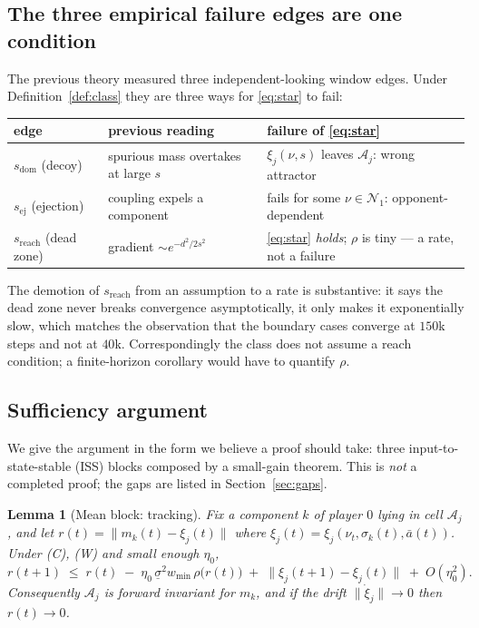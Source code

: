 \documentclass[11pt]{article}
\newtheorem{lemma}{Lemma}
\theoremstyle{definition}
\newcommand{\cA}{\mathcal{A}}
\newcommand{\cN}{\mathcal{N}}
\begin{document}
\subsection{The three empirical failure edges are one condition}

The previous theory measured three independent-looking window edges. Under
Definition~\ref{def:class} they are three ways for \eqref{eq:star} to fail:

\begin{center}
\begin{tabular}{@{}l p{} p{}@{}}
\hline
edge & previous reading & failure of \eqref{eq:star}\\
\hline
$s_{\mathrm{dom}}$ (decoy) & spurious mass overtakes at large $s$ &
  $\xi_j(\nu,s)$ leaves $\cA_j$: wrong attractor\\
$s_{\mathrm{ej}}$ (ejection) & coupling expels a component &
  fails for some $\nu \in \cN_1$: opponent-dependent\\
$s_{\mathrm{reach}}$ (dead zone) & gradient $\sim e^{-d^2/2s^2}$ &
  \eqref{eq:star} \emph{holds}; $\rho$ is tiny --- a rate, not a failure\\
\hline
\end{tabular}
\end{center}

The demotion of $s_{\mathrm{reach}}$ from an assumption to a rate is substantive:
it says the dead zone never breaks convergence asymptotically, it only makes it
exponentially slow, which matches the observation that the boundary cases
converge at $150$k steps and not at $40$k. Correspondingly the class does not
assume a reach condition; a finite-horizon corollary would have to quantify
$\rho$.

\subsection{Sufficiency argument}\label{sec:suff}

We give the argument in the form we believe a proof should take: three
input-to-state-stable (ISS) blocks composed by a small-gain theorem. This is
\emph{not} a completed proof; the gaps are listed in Section~\ref{sec:gaps}.

\begin{lemma}[Mean block: tracking]\label{lem:mean}
Fix a component $k$ of player $0$ lying in cell $\cA_j$, and let
$r(t) = \|m_k(t) - \xi_j(t)\|$ where $\xi_j(t) = \xi_j(\nu_t, \sigma_k(t),
\bar a(t))$. Under (C), (W) and small enough $\eta_0$,
\begin{equation}\label{eq:iss}
  r(t+1) \;\le\; r(t) \;-\; \eta_0\, \underline\sigma^2 w_{\min}\, \rho\big(r(t)\big)
  \;+\; \big\|\xi_j(t+1) - \xi_j(t)\big\| \;+\; O(\eta_0^2).
\end{equation}
Consequently $\cA_j$ is forward invariant for $m_k$, and if the drift
$\|\dot\xi_j\| \to 0$ then $r(t) \to 0$.
\end{lemma}
\end{document}
